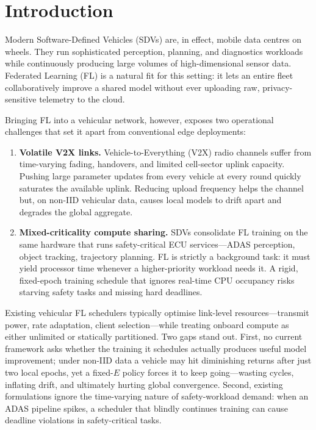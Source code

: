 \documentclass[conference]{IEEEtran}
\begin{document}
\section{Introduction}
Modern Software-Defined Vehicles (SDVs) are, in effect, mobile data centres on wheels. They run sophisticated perception, planning, and diagnostics workloads while continuously producing large volumes of high-dimensional sensor data. Federated Learning (FL) is a natural fit for this setting: it lets an entire fleet collaboratively improve a shared model without ever uploading raw, privacy-sensitive telemetry to the cloud.

Bringing FL into a vehicular network, however, exposes two operational challenges that set it apart from conventional edge deployments:
\begin{enumerate}
    \item \textbf{Volatile V2X links.} Vehicle-to-Everything (V2X) radio channels suffer from time-varying fading, handovers, and limited cell-sector uplink capacity. Pushing large parameter updates from every vehicle at every round quickly saturates the available uplink. Reducing upload frequency helps the channel but, on non-IID vehicular data, causes local models to drift apart and degrades the global aggregate.
    \item \textbf{Mixed-criticality compute sharing.} SDVs consolidate FL training on the same hardware that runs safety-critical ECU services---ADAS perception, object tracking, trajectory planning. FL is strictly a background task: it must yield processor time whenever a higher-priority workload needs it. A rigid, fixed-epoch training schedule that ignores real-time CPU occupancy risks starving safety tasks and missing hard deadlines.
\end{enumerate}

Existing vehicular FL schedulers typically optimise link-level resources---transmit power, rate adaptation, client selection---while treating onboard compute as either unlimited or statically partitioned. Two gaps stand out. First, no current framework asks whether the training it schedules actually produces useful model improvement; under non-IID data a vehicle may hit diminishing returns after just two local epochs, yet a fixed-$E$ policy forces it to keep going---wasting cycles, inflating drift, and ultimately hurting global convergence. Second, existing formulations ignore the time-varying nature of safety-workload demand: when an ADAS pipeline spikes, a scheduler that blindly continues training can cause deadline violations in safety-critical tasks.
\end{document}
